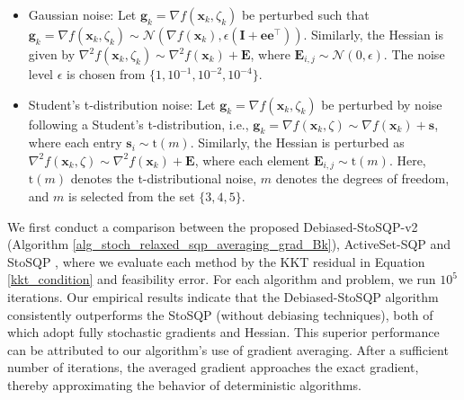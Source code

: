 \documentclass[aos]{imsart}
\numberwithin{equation}{section}
\theoremstyle{plain}
\newcommand{\michael}[1]{\textcolor{red}{Michael:\ #1}}
\newcommand{\yihang}[1]{\textcolor{blue}{Yihang:\ #1}}
\begin{document}
\begin{itemize}
    \item Gaussian noise: Let $\bm{g}_k = \nabla f(\bm{x}_k, \zeta_k)$ be perturbed such that $\bm{g}_k = \nabla f(\bm{x}_k, \zeta_k) \sim \mathcal{N}(\nabla f(\bm{x}_k), \epsilon (\bm{I} + \bm{e} \bm{e}^{\top}))$. Similarly, the Hessian is given by $\nabla^2 f(\bm{x}_{k}, \zeta_k) \sim \nabla^2 f(\bm{x}_{k}) + \bm{E}$, where $\bm{E}_{i,j} \sim \mathcal{N}(0, \epsilon)$. The noise level $\epsilon$ is chosen from $\{1, 10^{-1}, 10^{-2}, 10^{-4} \}$. 

    \item Student's t-distribution noise: 
    Let $\bm{g}_k = \nabla f(\bm{x}_k, \zeta_k)$ be perturbed by noise following a Student's t-distribution, i.e., $\bm{g}_k = \nabla f(\bm{x}_k, \zeta) \sim \nabla f(\bm{x}_k) +  \bm{s}$, where each entry $\bm{s}_{i} \sim \text{t}(m)$. Similarly, the Hessian is perturbed as $\nabla^2 f(\bm{x}_{k}, \zeta) \sim \nabla^2 f(\bm{x}_{k}) + \bm{E}$, where each element $\bm{E}_{i,j} \sim \text{t}(m)$. Here, $\text{t}(m)$ denotes the t-distributional noise, $m$ denotes the degrees of freedom, and $m$ is selected from the set $\{3, 4, 5\}$.
\end{itemize}
We first conduct a comparison between the proposed Debiased-StoSQP-v2 (Algorithm \ref{alg_stoch_relaxed_sqp_averaging_grad_Bk}), ActiveSet-SQP \cite{na2023inequality} and StoSQP \cite{curtis2023sequential}, where we evaluate each method by the KKT residual in Equation \eqref{kkt_condition} and feasibility error. 
For each algorithm and problem, we run $10^5$ iterations. 
Our empirical results indicate that the Debiased-StoSQP algorithm consistently outperforms the StoSQP (without debiasing techniques), both of which adopt fully stochastic gradients and Hessian. 
This superior performance can be attributed to our algorithm's use of gradient averaging. 
After a sufficient number of iterations, the averaged gradient approaches the exact gradient, thereby approximating the behavior of deterministic algorithms.
\end{document}
